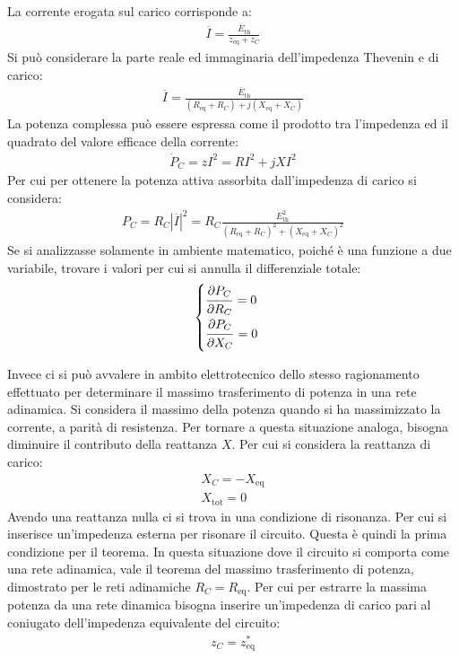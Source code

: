 \documentclass{article}
\numberwithin{equation}{subsection}
\begin{document}
La corrente erogata sul carico corrisponde a:
\begin{gather*}
    \overline{I}=\displaystyle\frac{\overline{E}_\mathrm{th}}{z_\mathrm{eq}+z_C}
\end{gather*}
Si può considerare la parte reale ed immaginaria dell'impedenza Thevenin e di carico:
\begin{gather*}
    \overline{I}=\displaystyle\frac{\overline{E}_\mathrm{th}}{(R_\mathrm{eq}+R_{C})+j(X_\mathrm{eq}+X_C)}
\end{gather*}
La potenza complessa può essere espressa come il prodotto tra l'impedenza ed il quadrato del valore efficace della corrente:
\begin{gather*}
    \dot P_C=zI^2=RI^2+jXI^2
\end{gather*}
Per cui per ottenere la potenza attiva assorbita dall'impedenza di carico si considera:
\begin{gather*}
    P_C=R_C|\overline I|^2=R_C\displaystyle\frac{E_\mathrm{th}^2}{(R_\mathrm{eq}+R_C)^2+(X_\mathrm{eq}+X_C)^2}
\end{gather*}
Se si analizzasse solamente in ambiente matematico, poiché è una funzione a due variabile, trovare i valori per cui si annulla il differenziale totale:
\begin{gather*}
    \begin{cases}
        \displaystyle\frac{\strut \partial P_C}{\strut \partial R_C}=0\\
        \displaystyle\frac{\strut \partial P_C}{\strut \partial X_C}=0
    \end{cases}
\end{gather*}

Invece ci si può avvalere in ambito elettrotecnico dello stesso ragionamento effettuato per determinare il massimo trasferimento di potenza in una rete adinamica. Si 
considera il massimo della potenza quando si ha massimizzato la corrente, a parità di resistenza. Per tornare a questa situazione analoga, bisogna diminuire il contributo 
della reattanza $X$. Per cui si considera la reattanza di carico:
\begin{gather*}
    X_C=-X_\mathrm{eq}\\
    X_\mathrm{tot}=0
\end{gather*}
Avendo una reattanza nulla ci si trova in una condizione di risonanza. Per cui si inserisce un'impedenza esterna per risonare il circuito. Questa è quindi la prima 
condizione per il teorema. In questa situazione dove il circuito si comporta come una rete adinamica, vale il teorema del massimo trasferimento di potenza, dimostrato 
per le reti adinamiche $R_C=R_\mathrm{eq}$. 
Per cui per estrarre la massima potenza da una rete dinamica bisogna inserire un'impedenza di carico pari al coniugato dell'impedenza equivalente del circuito:
\begin{gather}
    z_C=z_\mathrm{eq}^*
\end{gather}
\end{document}
